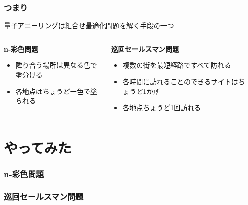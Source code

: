 \begin{frame}
  \frametitle{つまり}

  {\Large   量子アニーリングは組合せ最適化問題を解く手段の一つ}
  \vspace{5mm}

  \begin{columns}[t]
    \begin{column}{0.45\textwidth}
      \textbf{n-彩色問題}
      \begin{itemize}
          \item 隣り合う場所は異なる色で塗分ける
          \item<2-5> {\color{important_font}各地点はちょうど一色で塗られる}
      \end{itemize}
    \end{column}

    \begin{column}{0.45\textwidth}
      \textbf{巡回セールスマン問題}
      \begin{itemize}
          \item 複数の街を最短経路ですべて訪れる
          \item<3-5>{\color{important_font}各時間に訪れることのできるサイトはちょうど1か所}
          \item<4,5>{\color{important_font}各地点ちょうど1回訪れる}
      \end{itemize}
    \end{column}
  \end{columns}
  \vspace{5mm}
\end{frame}

\section{やってみた}
\begin{frame}
  \frametitle{n-彩色問題}
\end{frame}
\begin{frame}
  \frametitle{巡回セールスマン問題}
\end{frame}


